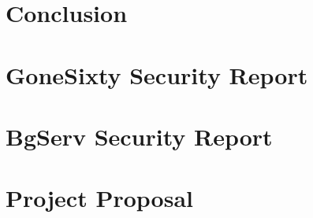 \documentclass[12pt,twoside,notitlepage]{report}
\begin{document}
\cleardoublepage
\chapter{Conclusion}



\cleardoublepage



\cleardoublepage

\appendix

\chapter{GoneSixty Security Report}
\label{chapter:Report_Gone60}

\cleardoublepage

\chapter{BgServ Security Report}
\label{chapter:Report_BgServ}

\cleardoublepage

\chapter{Project Proposal}


\end{document}
